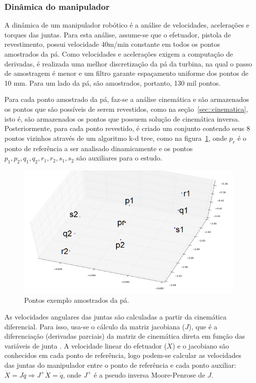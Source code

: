 \subsubsection{Dinâmica do manipulador}
A dinâmica de um manipulador robótico é a análise de velocidades, acelerações e
torques das juntas. Para esta análise, assume-se que o efetuador, pistola de
revestimento, possui velocidade 40m/min constante em todos os pontos amostrados
da pá. Como velocidades e acelerações exigem a computação de derivadas, é
realizada uma melhor discretização da pá da turbina, na qual o passo de
amostragem é menor e um filtro garante espaçamento uniforme dos pontos de 10 mm.
Para um lado da pá, são amostrados, portanto, 130 mil pontos.

Para cada ponto amostrado da pá, faz-se a análise cinemática e são armazenados
os pontos que são possíveis de serem revestidos, como na
seção~\ref{sec::cinematica}, isto é, são armazenados os pontos que possuem
solução de cinemática inversa. Posteriormente, para cada ponto revestido, é
criado um conjunto contendo seus 8 pontos vizinhos através de um algoritmo k-d
tree, como na figura~\ref{fig::pontosdin}, onde $p_r$ é o ponto de referência a
ser analisado dinamicamente e os pontos ${p_1,p_2,q_1,q_2,r_1,r_2,s_1,s_2}$ são auxiliares
para o estudo. 

\begin{figure}[h!]	
	\includegraphics[width=\columnwidth]{figs/dinamica/pontosdinamica.png}
	\caption{Pontos exemplo amostrados da pá.}
	\label{fig::pontosdin}
\end{figure}

As velocidades angulares das juntas são calculadas a partir da cinemática
diferencial. Para isso, usa-se o cálculo da matriz jacobiana ($J$), que é a
diferenciação (derivadas parciais) da matriz de cinemática direta em função das
variáveis de junta \citep{sciavicco2000differential}. A velocidade linear do
efetuador ($\dot{X}$) e o jacobiano são conhecidos em cada ponto de referência, logo
podem-se calcular as velocidades das juntas do manipulador entre o ponto de
referência e cada ponto auxiliar: $\dot{X} = J\dot{q}\Rightarrow
J^+\dot{X}=\dot{q}$, onde $J^+$ é a pseudo inversa Moore-Penrose de $J$.

